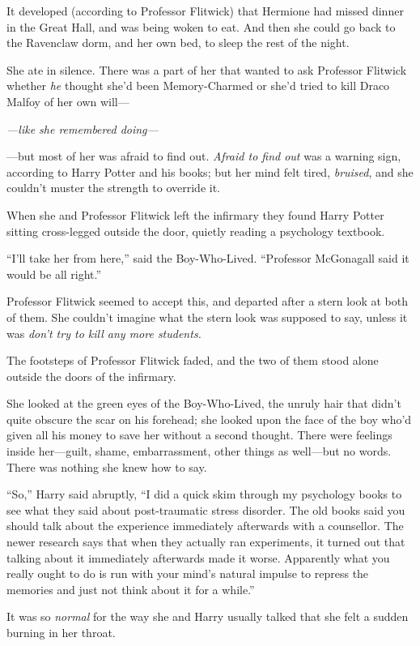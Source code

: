 It developed (according to Professor Flitwick) that Hermione had missed dinner in the Great Hall, and was being woken to eat. And then she could go back to the Ravenclaw dorm, and her own bed, to sleep the rest of the night.

She ate in silence. There was a part of her that wanted to ask Professor Flitwick whether \emph{he} thought she’d been Memory-Charmed or she’d tried to kill Draco Malfoy of her own will—

\emph{—like she remembered doing—}

—but most of her was afraid to find out. \emph{Afraid to find out} was a warning sign, according to Harry Potter and his books; but her mind felt tired, \emph{bruised}, and she couldn’t muster the strength to override it.

When she and Professor Flitwick left the infirmary they found Harry Potter sitting cross-legged outside the door, quietly reading a psychology textbook.

“I’ll take her from here,” said the Boy-Who-Lived. “Professor McGonagall said it would be all right.”

Professor Flitwick seemed to accept this, and departed after a stern look at both of them. She couldn’t imagine what the stern look was supposed to say, unless it was \emph{don’t try to kill any more students.}

The footsteps of Professor Flitwick faded, and the two of them stood alone outside the doors of the infirmary.

She looked at the green eyes of the Boy-Who-Lived, the unruly hair that didn’t quite obscure the scar on his forehead; she looked upon the face of the boy who’d given all his money to save her without a second thought. There were feelings inside her—guilt, shame, embarrassment, other things as well—but no words. There was nothing she knew how to say.

“So,” Harry said abruptly, “I did a quick skim through my psychology books to see what they said about post-traumatic stress disorder. The old books said you should talk about the experience immediately afterwards with a counsellor. The newer research says that when they actually ran experiments, it turned out that talking about it immediately afterwards made it worse. Apparently what you really ought to do is run with your mind’s natural impulse to repress the memories and just not think about it for a while.”

It was so \emph{normal} for the way she and Harry usually talked that she felt a sudden burning in her throat.

